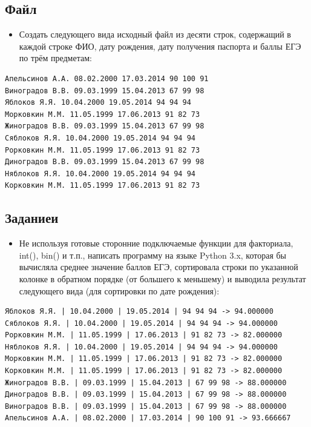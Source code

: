 \documentclass[11pt]{article}
\begin{document}
\subsection{Файл}
\label{sec:orgdd4dc55}
\begin{itemize}
\item Создать следующего вида исходный файл из десяти строк, содержащий в каждой строке ФИО, дату рождения, дату получения паспорта и баллы ЕГЭ по трём предметам:
\end{itemize}
\scriptsize
\begin{verbatim}
Апельсинов А.А. 08.02.2000 17.03.2014 90 100 91
Виноградов В.В. 09.03.1999 15.04.2013 67 99 98
Яблоков Я.Я. 10.04.2000 19.05.2014 94 94 94
Морковкин М.М. 11.05.1999 17.06.2013 91 82 73
Жиноградов В.В. 09.03.1999 15.04.2013 67 99 98
Сяблоков Я.Я. 10.04.2000 19.05.2014 94 94 94
Рорковкин М.М. 11.05.1999 17.06.2013 91 82 73
Диноградов В.В. 09.03.1999 15.04.2013 67 99 98
Няблоков Я.Я. 10.04.2000 19.05.2014 94 94 94
Корковкин М.М. 11.05.1999 17.06.2013 91 82 73
\end{verbatim}

\subsection{Заданиеи}
\label{sec:orgf128ebb}
\normalsize
\begin{itemize}
\item Не используя готовые сторонние подключаемые функции для факториала, int(), bin() и т.п., написать программу на языке Python 3.x, которая бы вычисляла среднее значение баллов ЕГЭ, сортировала строки по указанной колонке в обратном порядке (от большего к меньшему) и выводила результат следующего вида (для сортировки по дате рождения):
\end{itemize}
\scriptsize
\begin{verbatim}
Яблоков Я.Я. | 10.04.2000 | 19.05.2014 | 94 94 94 -> 94.000000
Сяблоков Я.Я. | 10.04.2000 | 19.05.2014 | 94 94 94 -> 94.000000
Рорковкин М.М. | 11.05.1999 | 17.06.2013 | 91 82 73 -> 82.000000
Няблоков Я.Я. | 10.04.2000 | 19.05.2014 | 94 94 94 -> 94.000000
Морковкин М.М. | 11.05.1999 | 17.06.2013 | 91 82 73 -> 82.000000
Корковкин М.М. | 11.05.1999 | 17.06.2013 | 91 82 73 -> 82.000000
Жиноградов В.В. | 09.03.1999 | 15.04.2013 | 67 99 98 -> 88.000000
Диноградов В.В. | 09.03.1999 | 15.04.2013 | 67 99 98 -> 88.000000
Виноградов В.В. | 09.03.1999 | 15.04.2013 | 67 99 98 -> 88.000000
Апельсинов А.А. | 08.02.2000 | 17.03.2014 | 90 100 91 -> 93.666667
\end{verbatim}
\end{document}
